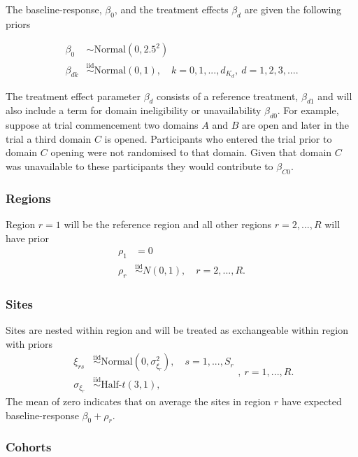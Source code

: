 \documentclass[
  11pt,
]{article}
\begin{document}
The baseline-response, \(\beta_0\), and the treatment effects \(\beta_d\) are given the following priors

\[
\begin{aligned}
\beta_0 &\sim \text{Normal}(0, 2.5^2) \\
\beta_{dk} &\overset{\text{iid}}{\sim} \text{Normal}(0, 1),\quad k=0,1,...,d_{K_d},\ d=1,2,3,....
\end{aligned}
\]

The treatment effect parameter \(\beta_d\) consists of a reference treatment, \(\beta_{d1}\) and will also include a term for domain ineligibility or unavailability \(\beta_{d0}\).
For example, suppose at trial commencement two domains \(A\) and \(B\) are open and later in the trial a third domain \(C\) is opened.
Participants who entered the trial prior to domain \(C\) opening were not randomised to that domain.
Given that domain \(C\) was unavailable to these participants they would contribute to \(\beta_{C0}\).

\hypertarget{regions}{%
\subsubsection{Regions}\label{regions}}

Region \(r=1\) will be the reference region and all other regions \(r=2,...,R\) will have prior
\[
\begin{aligned}
\rho_1 &= 0 \\
\rho_r &\overset{\text{iid}}{\sim} N(0, 1),\quad r=2,...,R.
\end{aligned}
\]

\hypertarget{sites}{%
\subsubsection{Sites}\label{sites}}

Sites are nested within region and will be treated as exchangeable within region with priors
\[
\begin{aligned}
\xi_{rs} &\overset{\text{iid}}{\sim} \text{Normal}\left(0, \sigma_{\xi_r}^2\right),\quad s=1,...,S_r\\
\sigma_{\xi_r} &\overset{\text{iid}}{\sim} \text{Half-}t(3,1), 
\end{aligned},\ r=1,...,R.
\]
The mean of zero indicates that on average the sites in region \(r\) have expected baseline-response \(\beta_0 + \rho_r\).

\hypertarget{cohorts}{%
\subsubsection{Cohorts}\label{cohorts}}
\end{document}
